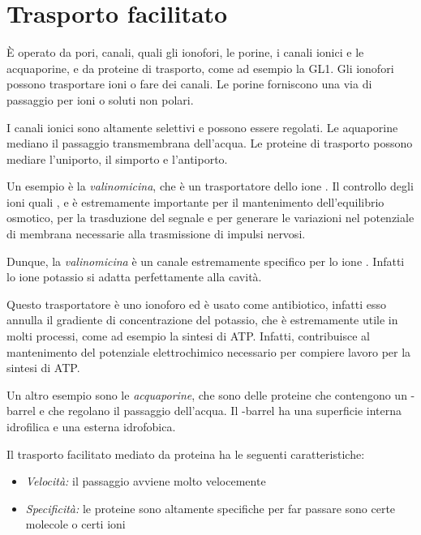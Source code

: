 \section{Trasporto facilitato}

È operato da pori, canali, quali gli ionofori, le porine, i canali ionici e le acquaporine, e da proteine di trasporto, come ad esempio la GL1. Gli ionofori possono trasportare ioni o fare dei canali. Le porine forniscono una via di passaggio per ioni o soluti non polari.

I canali ionici sono altamente selettivi e possono essere regolati. Le aquaporine mediano il passaggio transmembrana dell'acqua. Le proteine di trasporto possono mediare l'uniporto, il simporto e l'antiporto.



Un esempio è la \emph{valinomicina}, che è un trasportatore dello ione . Il controllo degli ioni quali ,  e  è estremamente importante per il mantenimento dell'equilibrio osmotico, per la trasduzione del segnale e per generare le variazioni nel potenziale di membrana necessarie alla trasmissione di impulsi nervosi.

Dunque, la \emph{valinomicina} è un canale estremamente specifico per lo ione . Infatti lo ione potassio si adatta perfettamente alla cavità.

Questo trasportatore è uno ionoforo ed è usato come antibiotico, infatti esso annulla il gradiente di concentrazione del potassio, che è estremamente utile in molti processi, come ad esempio la sintesi di ATP. Infatti, contribuisce al mantenimento del potenziale elettrochimico necessario per compiere lavoro per la sintesi di ATP.

Un altro esempio sono le \emph{acquaporine}, che sono delle proteine che contengono un \beta-barrel e che regolano il passaggio dell'acqua. Il \beta-barrel ha una superficie interna idrofilica e una esterna idrofobica.

Il trasporto facilitato mediato da proteina ha le seguenti caratteristiche:
\begin{itemize}
\item \emph{Velocità:} il passaggio avviene molto velocemente
\item \emph{Specificità:} le proteine sono altamente specifiche per far passare sono certe molecole o certi ioni
\end{itemize}

